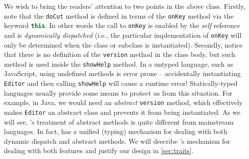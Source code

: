 We wish to bring the readers' attention to two points in the above class.
Firstly, note that the \lstinline{doCut} method is defined in terms of the
\lstinline{onKey} method via the keyword
\lstinline[language=JavaScript]{this}. In other words the call to
\lstinline{onKey} is enabled by the \emph{self} reference and is
\emph{dynamically dispatched} (i.e., the particular implementation of
\lstinline{onKey} will only be determined when the class or subclass
is instantiated). %
Secondly, notice that there is no definition of
the \lstinline{version} method in the class body, but such method is used inside the
\lstinline{showHelp} method. In a untyped language, such as JavaScript, using
undefined methods is error prone -- accidentally instantiating \lstinline{Editor}
and then calling \lstinline{showHelp} will cause a runtime error!
Statically-typed languages usually provide some means to protect us from this
situation. For example, in Java, we would need an \textit{abstract} \lstinline{version}
method, which effectively makes \lstinline{Editor} an abstract class and
prevents it from being instantiated. As we will see, \name's treatment of
abstract methods is quite different from mainstream languages. In fact, \name
has a unified (typing) mechanism for dealing with both dynamic dispatch and abstract
methods. We will describe \name's mechanism for dealing with both features and
justify our design in \cref{sec:traits}.


